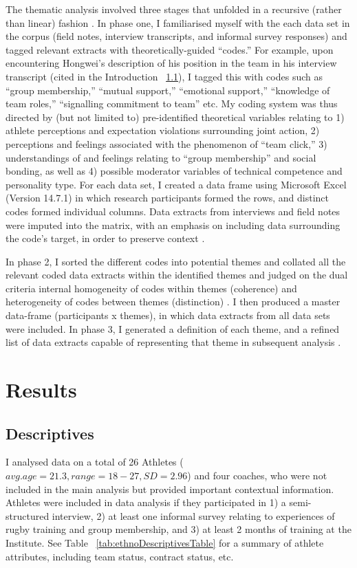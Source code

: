 The thematic analysis involved three stages that unfolded in a recursive (rather than linear) fashion \citep{Braun2006}. In phase one, I familiarised myself with the each data set in the corpus (field notes, interview transcripts, and informal survey responses) and tagged relevant extracts with theoretically-guided ``codes.'' For example, upon encountering Hongwei's description of his position in the team in his interview transcript (cited in the Introduction ~\ref{}), I tagged this with codes such as ``group membership,'' ``mutual support,'' ``emotional support,'' ``knowledge of team roles,'' ``signalling commitment to team'' etc.  My coding system was thus directed by (but not limited to) pre-identified theoretical variables relating to 1) athlete perceptions and expectation violations surrounding joint action, 2) perceptions and feelings associated with the phenomenon of ``team click,'' 3) understandings of and feelings relating to ``group membership'' and social bonding, as well as 4) possible moderator variables of technical competence and personality type.  For each data set, I created a data frame using Microsoft Excel (Version 14.7.1) in which research participants formed the rows, and distinct codes formed individual columns. Data extracts from interviews and field notes were imputed into the matrix, with an emphasis on including data surrounding the code's target, in order to preserve context \citep[see][]{Bryman2001}.

In phase 2, I sorted the different codes into potential themes and collated all the relevant coded data extracts within the identified themes and judged on the dual criteria internal homogeneity of codes within themes (coherence) and heterogeneity of codes between themes (distinction) \citep{Patton1990}.  I then produced a master data-frame (participants x themes), in which data extracts from all data sets were included.  In phase 3, I generated a definition of each theme, and a refined list of data extracts capable of representing that theme in subsequent analysis \citep{Braun2006}.














\section{Results}


\subsection{Descriptives}
I analysed data on a total of 26 Athletes ($avg. age = 21.3, range = 18-27, SD = 2.96$) and four coaches, who were not included in the main analysis but provided important contextual information.  Athletes were included in data analysis if they participated in 1) a semi-structured interview, 2) at least one informal survey relating to experiences of rugby training and group membership, and 3) at least 2 months of training at the Institute.  See Table ~\ref{tab:ethnoDescriptivesTable} for a summary of athlete attributes, including team status, contract status, etc.

